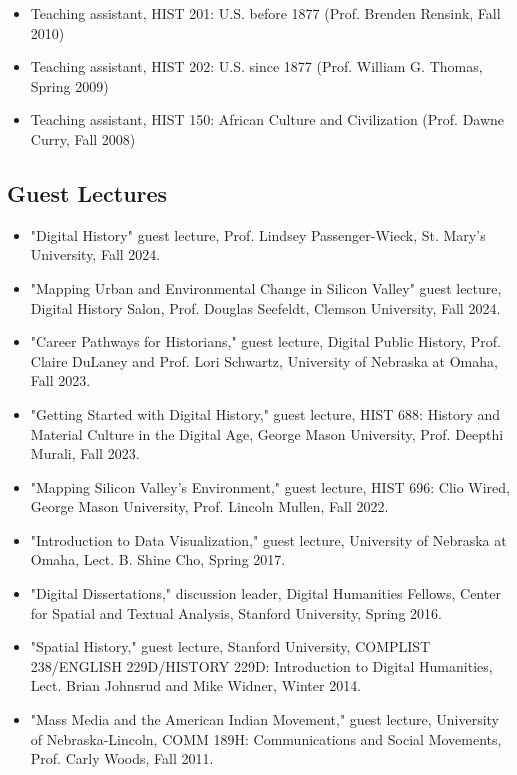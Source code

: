 \documentclass[10pt]{article}
\begin{document}
\begin{itemize}
  \item Teaching assistant, HIST 201: U.S. before 1877 (Prof. Brenden Rensink, Fall 2010)
  \item Teaching assistant, HIST 202: U.S. since 1877 (Prof. William G. Thomas, Spring 2009)
  \item Teaching assistant, HIST 150: African Culture and Civilization (Prof. Dawne Curry, Fall 2008)
\end{itemize}

\subsection*{Guest Lectures}

\begin{itemize}
  \item "Digital History" guest lecture, Prof. Lindsey Passenger-Wieck, St. Mary's University, Fall 2024.
  \item "Mapping Urban and Environmental Change in Silicon Valley" guest lecture, Digital History Salon, Prof. Douglas Seefeldt, Clemson University, Fall 2024.
  \item "Career Pathways for Historians," guest lecture, Digital Public History, Prof. Claire DuLaney and Prof. Lori Schwartz, University of Nebraska at Omaha, Fall 2023.
  \item "Getting Started with Digital History," guest lecture, HIST 688: History and Material Culture in the Digital Age, George Mason University, Prof. Deepthi Murali, Fall 2023.
  \item "Mapping Silicon Valley's Environment," guest lecture, HIST 696: Clio Wired, George Mason University, Prof. Lincoln Mullen, Fall 2022.
  \item "Introduction to Data Visualization," guest lecture, University of Nebraska at Omaha, Lect. B. Shine Cho, Spring 2017.
  \item "Digital Dissertations," discussion leader, Digital Humanities Fellows, Center for Spatial and Textual Analysis, Stanford University, Spring 2016.
  \item "Spatial History," guest lecture, Stanford University, COMPLIST 238/ENGLISH 229D/HISTORY 229D: Introduction to Digital Humanities, Lect. Brian Johnsrud and Mike Widner, Winter 2014.
  \item "Mass Media and the American Indian Movement," guest lecture, University of Nebraska-Lincoln, COMM 189H: Communications and Social Movements, Prof. Carly Woods, Fall 2011.

\end{itemize}
\end{document}
